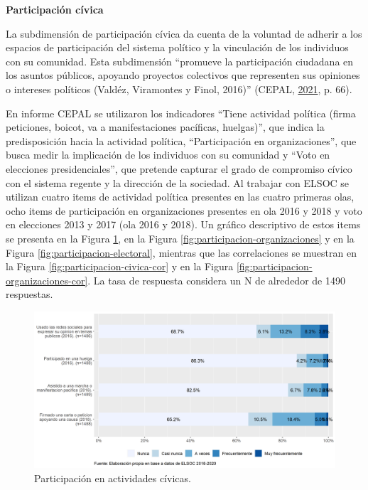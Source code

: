 \documentclass[
  12pt,
]{book}
\begin{document}
\textbf{Participación cívica}

La subdimensión de participación cívica da cuenta de la voluntad de adherir a los espacios de participación del sistema político y la vinculación de los individuos con su comunidad. Esta subdimensión ``promueve la participación ciudadana en los asuntos públicos, apoyando proyectos colectivos que representen sus opiniones o intereses políticos (Valdéz, Viramontes y Finol, 2016)'' (CEPAL, \protect\hyperlink{ref-cepal_cohesion_2021}{2021}, p. 66).

En informe CEPAL se utilizaron los indicadores ``Tiene actividad política (firma peticiones, boicot, va a manifestaciones pacíficas, huelgas)'', que indica la predisposición hacia la actividad política, ``Participación en organizaciones'', que busca medir la implicación de los individuos con su comunidad y ``Voto en elecciones presidenciales'', que pretende capturar el grado de compromiso cívico con el sistema regente y la dirección de la sociedad. Al trabajar con ELSOC se utilizan cuatro items de actividad política presentes en las cuatro primeras olas, ocho items de participación en organizaciones presentes en ola 2016 y 2018 y voto en elecciones 2013 y 2017 (ola 2016 y 2018). Un gráfico descriptivo de estos items se presenta en la Figura \ref{fig:participacion-civica}, en la Figura \ref{fig:participacion-organizaciones} y en la Figura \ref{fig:participacion-electoral}, mientras que las correlaciones se muestran en la Figura \ref{fig:participacion-civica-cor} y en la Figura \ref{fig:participacion-organizaciones-cor}. La tasa de respuesta considera un N de alrededor de 1490 respuestas.

\begin{figure}[H]

{\centering \includegraphics[width=1\linewidth,height=1\textheight]{output/graphs/participacion-civica} 

}

\caption{Participación en actividades cívicas.}\label{fig:participacion-civica}
\end{figure}
\end{document}
